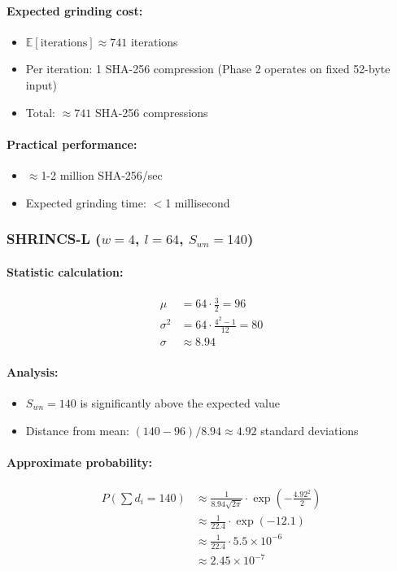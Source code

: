 \paragraph{Expected grinding cost:}
\begin{itemize}
    \item $\mathbb{E}[\text{iterations}] \approx 741$ iterations
    \item Per iteration: 1 SHA-256 compression (Phase 2 operates on fixed 52-byte input)
    \item Total: $\approx 741$ SHA-256 compressions
\end{itemize}

\paragraph{Practical performance:}
\begin{itemize}
    \item $\approx$1-2 million SHA-256/sec
    \item Expected grinding time: $<$1 millisecond
\end{itemize}

\subsubsection{SHRINCS-L ($w=4$, $l=64$, $S_{wn}=140$)}

\paragraph{Statistic calculation:}
\begin{align}
    \mu &= 64 \cdot \frac{3}{2} = 96 \\
    \sigma^2 &= 64 \cdot \frac{4^2-1}{12} = 80 \\
    \sigma &\approx 8.94
\end{align}

\paragraph{Analysis:}
\begin{itemize}
    \item $S_{wn} = 140$ is significantly above the expected value
    \item Distance from mean: $(140 - 96)/8.94 \approx 4.92$ standard deviations
\end{itemize}

\paragraph{Approximate probability:}
\begin{align}
    P(\sum d_i = 140) &\approx \frac{1}{8.94\sqrt{2\pi}} \cdot \exp\left(-\frac{4.92^2}{2}\right) \nonumber \\
    &\approx \frac{1}{22.4} \cdot \exp(-12.1) \nonumber \\
    &\approx \frac{1}{22.4} \cdot 5.5 \times 10^{-6} \nonumber \\
    &\approx 2.45 \times 10^{-7}
\end{align}

